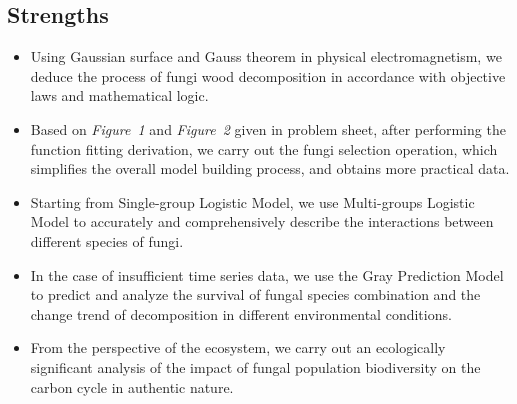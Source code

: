 \subsection{Strengths}
\begin{itemize}
  \item Using Gaussian surface and Gauss theorem in physical electromagnetism, we deduce the process of fungi wood decomposition in accordance with objective laws and mathematical logic.
  \item Based on \textit{Figure~1} and \textit{Figure~2} given in problem sheet, after performing the function fitting derivation, we carry out the fungi selection operation, which simplifies the overall model building process, and obtains more practical data.
  \item Starting from Single-group Logistic Model, we use Multi-groups Logistic Model to accurately and comprehensively describe the interactions between different species of fungi.
  \item In the case of insufficient time series data, we use the Gray Prediction Model to predict and analyze the survival of fungal species combination and the change trend of decomposition in different environmental conditions.
  \item From the perspective of the ecosystem, we carry out an ecologically significant analysis of the impact of fungal population biodiversity on the carbon cycle in authentic nature.
\end{itemize}
